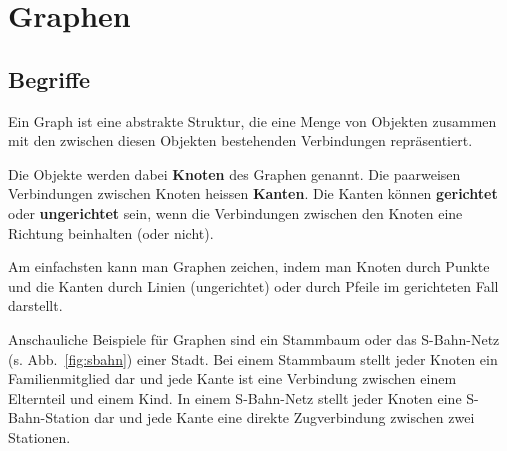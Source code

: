 \section{Graphen}




\subsection{Begriffe}

Ein Graph ist eine abstrakte Struktur, die eine Menge von Objekten zusammen mit den zwischen diesen Objekten bestehenden Verbindungen repräsentiert. 

Die Objekte werden dabei \textbf{Knoten} des Graphen genannt. 
Die paarweisen Verbindungen zwischen Knoten heissen \textbf{Kanten}. 
Die Kanten können \textbf{gerichtet} oder \textbf{ungerichtet} sein, wenn die Verbindungen zwischen den Knoten eine Richtung beinhalten (oder nicht).

Am einfachsten kann man Graphen zeichen, indem man Knoten durch Punkte und die Kanten durch Linien (ungerichtet) oder durch Pfeile im gerichteten Fall darstellt. 

\begin{mbsp}
Anschauliche Beispiele für Graphen sind ein Stammbaum oder das S-Bahn-Netz (s. Abb.~\ref{fig:sbahn}) einer Stadt. 
Bei einem Stammbaum stellt jeder Knoten ein Familienmitglied dar und jede Kante ist eine Verbindung zwischen einem Elternteil und einem Kind. 
In einem S-Bahn-Netz stellt jeder Knoten eine S-Bahn-Station dar und jede Kante eine direkte Zugverbindung zwischen zwei Stationen.
\end{mbsp}
%
%

